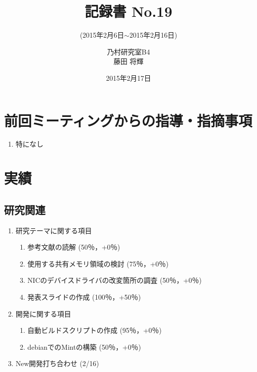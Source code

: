 \documentclass[fleqn, 14pt]{extarticle}
\subtitle{(2015年2月6日$\sim$2015年2月16日)}
\author{乃村研究室B4\\藤田 将輝}
\date{2015年2月17日}
\title{記録書 No.19}
\begin{document}
\maketitle
\section{前回ミーティングからの指導・指摘事項}
\label{sec-1}
\begin{enumerate}
\item 特になし
\newline
\hfill

\end{enumerate}




\section{実績}
\label{sec-2}

\subsection{研究関連}
\label{sec-2-1}
\begin{enumerate}
    \item 研究テーマに関する項目
    \hfill
    \label{enum-research1}
    \begin{enumerate}

        \item 参考文献の読解
        \hfill
        \label{enum-1-A}
        (50％，+0％)
        \item 使用する共有メモリ領域の検討
        \hfill
        \label{enum-1-B}
        (75％，+0％)
        \item NICのデバイスドライバの改変箇所の調査
        \hfill
        \label{enum-1-C}
        (50％，+0％)
        \item 発表スライドの作成 
        \hfill
        \label{enum-1-F}
        (100％，+50％)
    \end{enumerate}
    \item 開発に関する項目
    \hfill
    \label{enum-research2}
    \begin{enumerate}

        \item 自動ビルドスクリプトの作成
        \hfill
        \label{enum-2-A}
        (95％，+0％)
        \item debianでのMintの構築
        \hfill
        \label{enum-2-A}
        (50％，+0％)
    \end{enumerate}
    \item New開発打ち合わせ 
    \hfill
    \label{enum-research3}
    (2/16)
    \end{enumerate}
\end{document}
